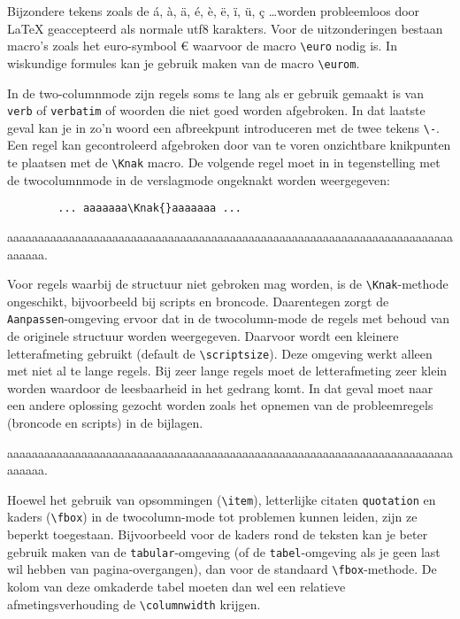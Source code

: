 
Bijzondere tekens zoals de á, à, ä, é, è, ë, ï, ü, ç \ldots worden
probleemloos door \LaTeX{} geaccepteerd als normale utf8
karakters. Voor de uitzonderingen bestaan macro's zoals het
euro-symbool \euro{} waarvoor de macro \verb!\euro! nodig is. In
wiskundige formules kan je gebruik maken van de macro \verb!\eurom!.


In de two-columnmode zijn regels soms te lang als er gebruik gemaakt
is van \verb!verb! of \verb!verbatim! of woorden die niet goed worden
afgebroken. In dat laatste geval kan je in zo'n woord een afbreekpunt
introduceren met de twee tekens \verb!\-!. Een regel kan gecontroleerd
afgebroken door van te voren onzichtbare knikpunten te plaatsen met de
\verb!\Knak! macro. De volgende regel moet in in tegenstelling met de
twocolumnmode in de verslagmode ongeknakt worden weergegeven:

\begin{Aanpassen}
	\begin{verbatim}
		... aaaaaaa\Knak{}aaaaaaa ...
	\end{verbatim}
\end{Aanpassen}


aaaaaaaaaaaaaaaaaaaaaaaaaaaaaaaaaaaaaaa\Knak{}aaaaaaaaaaaaaaaaaaaaaaaaaaaaaaaaaaaaaaa.

Voor regels waarbij de structuur niet gebroken mag worden, is de
\verb!\Knak!-methode ongeschikt, bijvoorbeeld bij scripts en
broncode. Daarentegen zorgt de \verb!Aanpassen!-omgeving ervoor dat in
de twocolumn-mode de regels met behoud van de originele structuur
worden weergegeven. Daarvoor wordt een kleinere letterafmeting
gebruikt (default de \verb!\scriptsize!). Deze omgeving werkt alleen
met niet al te lange regels. Bij zeer lange regels moet de
letterafmeting zeer klein worden waardoor de leesbaarheid in het
gedrang komt. In dat geval moet naar een andere oplossing gezocht
worden zoals het opnemen van de probleemregels (broncode en scripts)
in de bijlagen.

\begin{Aanpassen}[\tiny]
	aaaaaaaaaaaaaaaaaaaaaaaaaaaaaaaaaaaaaaaaaaaaaaaaaaaaaaaaaaaaaaaaaaaaaaaaaaaaaa.
\end{Aanpassen}

Hoewel het gebruik van opsommingen (\verb!\item!), letterlijke citaten
\verb!quotation! en kaders (\verb!\fbox!) in de twocolumn-mode tot
problemen kunnen leiden, zijn ze beperkt toegestaan. Bijvoorbeeld voor
de kaders rond de teksten kan je beter gebruik maken van de
\verb!tabular!-omgeving (of de \verb!tabel!-omgeving als je geen last
wil hebben van pagina-overgangen), dan voor de standaard
\verb!\fbox!-methode. De kolom van deze omkaderde tabel moeten dan wel
een relatieve afmetingsverhouding de \verb!\columnwidth! krijgen.

